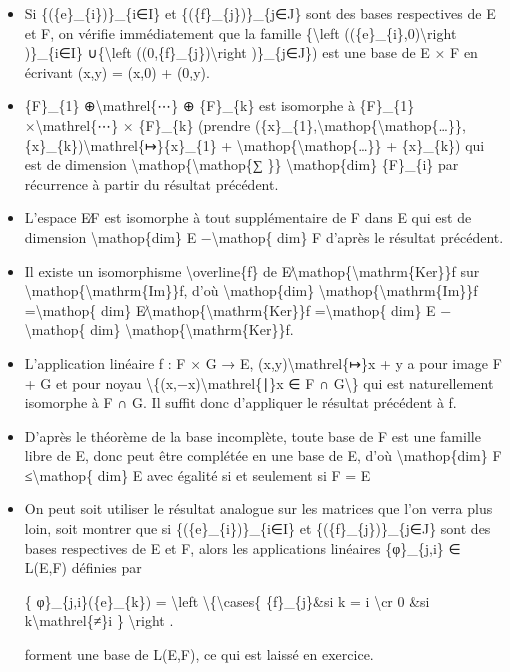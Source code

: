 \documentclass[]{article}
\begin{document}
\begin{itemize}
\item
  Si \{(\{e\}\_\{i\})\}\_\{i∈I\} et \{(\{f\}\_\{j\})\}\_\{j∈J\} sont des
  bases respectives de E et F, on vérifie immédiatement que la famille
  \{\textbackslash{}left ((\{e\}\_\{i\},0)\textbackslash{}right
  )\}\_\{i∈I\} ∪\{\textbackslash{}left
  ((0,\{f\}\_\{j\})\textbackslash{}right )\}\_\{j∈J\}) est une base de E
  × F en écrivant (x,y) = (x,0) + (0,y).
\item
  \{F\}\_\{1\} ⊕\textbackslash{}mathrel\{⋯\} ⊕ \{F\}\_\{k\} est
  isomorphe à \{F\}\_\{1\} ×\textbackslash{}mathrel\{⋯\} × \{F\}\_\{k\}
  (prendre
  (\{x\}\_\{1\},\textbackslash{}mathop\{\textbackslash{}mathop\{\ldots{}\}\},\{x\}\_\{k\})\textbackslash{}mathrel\{↦\}\{x\}\_\{1\}
  + \textbackslash{}mathop\{\textbackslash{}mathop\{\ldots{}\}\} +
  \{x\}\_\{k\}) qui est de dimension
  \textbackslash{}mathop\{\textbackslash{}mathop\{∑ \}\}
  \textbackslash{}mathop\{dim\} \{F\}\_\{i\} par récurrence à partir du
  résultat précédent.
\item
  L'espace E∕F est isomorphe à tout supplémentaire de F dans E qui est
  de dimension \textbackslash{}mathop\{dim\} E −\textbackslash{}mathop\{
  dim\} F d'après le résultat précédent.
\item
  Il existe un isomorphisme \textbackslash{}overline\{f\} de
  E∕\textbackslash{}mathop\{\textbackslash{}mathrm\{Ker\}\}f sur
  \textbackslash{}mathop\{\textbackslash{}mathrm\{Im\}\}f, d'où
  \textbackslash{}mathop\{dim\}
  \textbackslash{}mathop\{\textbackslash{}mathrm\{Im\}\}f
  =\textbackslash{}mathop\{ dim\}
  E∕\textbackslash{}mathop\{\textbackslash{}mathrm\{Ker\}\}f
  =\textbackslash{}mathop\{ dim\} E −\textbackslash{}mathop\{ dim\}
  \textbackslash{}mathop\{\textbackslash{}mathrm\{Ker\}\}f.
\item
  L'application linéaire f : F × G → E,
  (x,y)\textbackslash{}mathrel\{↦\}x + y a pour image F + G et pour
  noyau \textbackslash{}\{(x,−x)\textbackslash{}mathrel\{∣\}x ∈ F ∩
  G\textbackslash{}\} qui est naturellement isomorphe à F ∩ G. Il suffit
  donc d'appliquer le résultat précédent à f.
\item
  D'après le théorème de la base incomplète, toute base de F est une
  famille libre de E, donc peut être complétée en une base de E, d'où
  \textbackslash{}mathop\{dim\} F ≤\textbackslash{}mathop\{ dim\} E avec
  égalité si et seulement si F = E
\item
  On peut soit utiliser le résultat analogue sur les matrices que l'on
  verra plus loin, soit montrer que si \{(\{e\}\_\{i\})\}\_\{i∈I\} et
  \{(\{f\}\_\{j\})\}\_\{j∈J\} sont des bases respectives de E et F,
  alors les applications linéaires \{φ\}\_\{j,i\} ∈ L(E,F) définies par

  \{ φ\}\_\{j,i\}(\{e\}\_\{k\}) = \textbackslash{}left
  \textbackslash{}\{\textbackslash{}cases\{ \{f\}\_\{j\}\&si k = i
  \textbackslash{}cr 0 \&si k\textbackslash{}mathrel\{≠\}i \}
  \textbackslash{}right .

  forment une base de L(E,F), ce qui est laissé en exercice.
\end{itemize}
\end{document}

